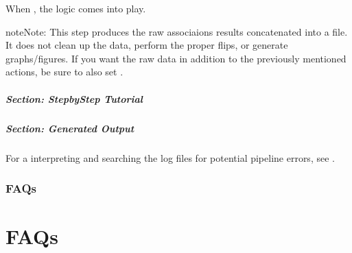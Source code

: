 \documentclass[letterpaper,10pt,english]{sphinxmanual}
\begin{document}
\begin{sphinxVerbatim}[commandchars=\\\{\}]
\end{sphinxVerbatim}

When , the  logic comes into play.

\begin{sphinxadmonition}{note}{Note:}
This step produces the raw associaions results concatenated into a file.  It does not clean up the data, perform the proper flips, or generate graphs/figures.  If you want the raw data in addition to the previously mentioned actions, be sure to also set .
\end{sphinxadmonition}


\paragraph{Section: Step\sphinxhyphen{}by\sphinxhyphen{}Step Tutorial}
\label{\detokenize{generateAssociationOnlyTutorial:section-step-by-step-tutorial}}

\paragraph{Section: Generated Output}
\label{\detokenize{generateAssociationOnlyTutorial:section-generated-output}}



For a interpreting and searching the log files for potential pipeline errors, see {\hyperref[\detokenize{parsingStdErrOut::doc}]{}}.




\subsection{FAQs}
\label{\detokenize{exampleWorkFlows:faqs}}

\chapter{FAQs}
\label{\detokenize{index:faqs}}
\end{document}
